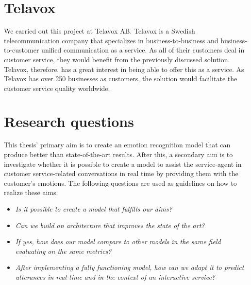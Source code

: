 \documentclass[nofilelist]{cslthse-msc}
\begin{document}



\section{Telavox}
We carried out this project at Telavox AB. Telavox is a Swedish telecommunication company that specializes in business-to-business and business-to-customer unified communication as a service. As all of their customers deal in customer service, they would benefit from the previously discussed solution. Telavox, therefore, has a great interest in being able to offer this as a service. As Telavox has over 250 businesses as customers, the solution would facilitate the customer service quality worldwide.


\section{Research questions}
\label{research_questions}
This thesis' primary aim is to create an emotion recognition model that can produce better than state-of-the-art results. After this, a secondary aim is to investigate whether it is possible to create a model to assist the service-agent in customer service-related conversations in real time by providing them with the customer's emotions. The following questions are used as guidelines on how to realize these aims.  
%
\begin{itemize}
    \item \textit{Is it possible to create a model that fulfills our aims?}
    \item \textit{Can we build an architecture that improves the state of the art?}
    
    \item \textit{If yes, how does our model compare to other models in the same field evaluating on the same metrics?}
    \item \textit{After implementing a fully functioning model, how can we adapt it to predict utterances in real-time and in the context of an interactive service?}
\end{itemize}
\end{document}
